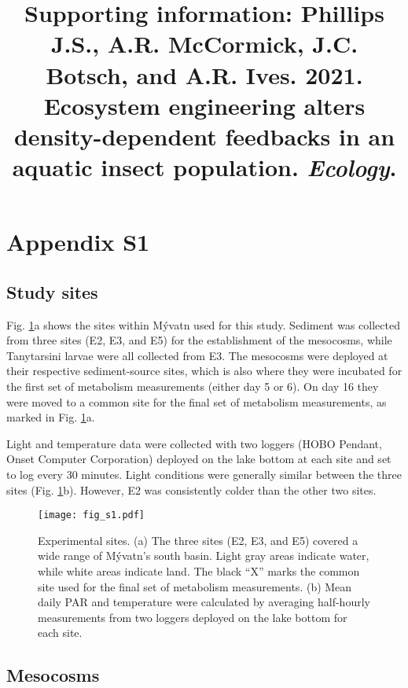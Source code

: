 \documentclass[12pt]{article}
\title{\textbf{Supporting information:}
          Phillips J.S., A.R. McCormick, J.C. Botsch, and A.R. Ives. 
          2021. Ecosystem engineering alters density-dependent feedbacks 
          in an aquatic insect population. \textit{Ecology}.}
\date{}
\makeatletter
\renewcommand{\maketitle}{\bgroup\setlength{\parindent}{0pt}
\begin{flushleft}
  \@title
\end{flushleft}\egroup
}
\makeatother
\begin{document}
\setlength\parindent{0.25in}

\maketitle


\linenumbers{}

\section*{Appendix S1}

\subsection*{Study sites}

Fig. \ref{fig:sites}a shows the sites within M\'{y}vatn used for this study. 
Sediment was collected from three sites (E2, E3, and E5) for the establishment of the mesocosms,
while Tanytarsini larvae were all collected from E3. 
The mesocosms were deployed at their respective sediment-source sites, 
which is also where they were incubated for the first set of metabolism measurements
(either day 5 or 6). 
On day 16 they were moved to a common site for the final set of metabolism measurements,
as marked in Fig. \ref{fig:sites}a.

Light and temperature data were collected with two loggers 
(HOBO Pendant, Onset Computer Corporation) deployed on the lake bottom at each site
and set to log every 30 minutes.
Light conditions were generally similar between the three sites (Fig. \ref{fig:sites}b).
However, E2 was consistently colder than the other two sites.

\begin{figure}
\centering
\texttt{[image: fig\_s1.pdf]}
\caption{\label{fig:sites}
Experimental sites. 
(a) The three sites (E2, E3, and E5) covered a wide range of M\'{y}vatn's south basin.
Light gray areas indicate water, while white areas indicate land.
The black ``X'' marks the common site used for the final set of metabolism measurements.
(b) Mean daily PAR and temperature were calculated by averaging half-hourly
measurements from two loggers deployed on the lake bottom for each site.
}
\end{figure}

\clearpage

\subsection*{Mesocosms}
\end{document}
